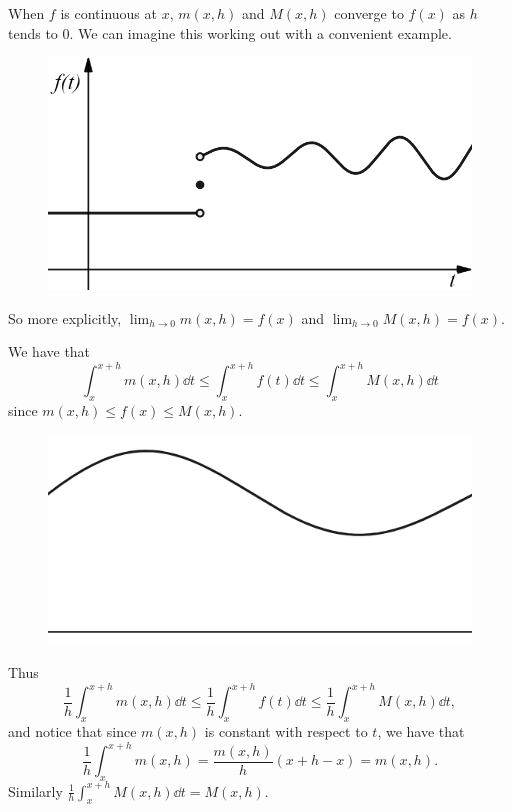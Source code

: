 \documentclass[mathserif]{beamer}
\newcommand{\br}[1]{\left(#1\right)}
\begin{document}
\begin{frame}
  When $f$ is continuous at $x$, $m(x,h)$ and $M(x,h)$ converge to $f(x)$ as $h$ tends to $0$. We can imagine this working out with a convenient example.

  \begin{figure}[h]
    \centering
    \includegraphics[scale=0.4]{wiggly}
  \end{figure}

  So more explicitly, $\displaystyle{\lim_{h\to 0} m(x,h) = f(x)}$ and $\displaystyle{\lim_{h\to 0} M(x,h) = f(x)}$.

\end{frame}

\begin{frame}
  We have that $$\int_x^{x+h} m(x,h) \dd{t} \leq \int_x^{x+h} f(t)\dd{t} \leq \int_x^{x+h} M(x,h)\dd{t}$$ since $m(x,h)\leq f(x)\leq M(x,h)$. 

  \begin{figure}[h]
    \centering
    \includegraphics[scale=0.66]{squish}
  \end{figure}

\end{frame}

\begin{frame}
  Thus $$\frac{1}{h}\int_x^{x+h} m(x,h) \dd{t} \leq \frac{1}{h}\int_x^{x+h} f(t)\dd{t} \leq \frac{1}{h}\int_x^{x+h} M(x,h)\dd{t},$$ and notice that since $m(x,h)$ is constant with respect to $t$, we have that $$\frac{1}{h}\int_x^{x+h} m(x,h) = \frac{m(x,h)}{h}\br{x+h-x} = m(x,h).$$ Similarly $\frac{1}{h}\int_x^{x+h}M(x,h)\dd{t} = M(x,h)$.
\end{frame}
\end{document}
